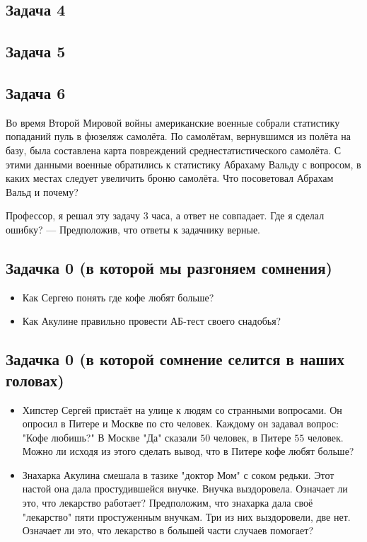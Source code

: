 \documentclass[12pt, a4paper, oneside]{article}
\begin{document}
\subsection*{Задача 4} 



\subsection*{Задача 5} 


\subsection*{Задача 6} 

Во время Второй Мировой войны американские военные собрали статистику попаданий пуль в фюзеляж самолёта. По самолётам, вернувшимся из полёта на базу, была составлена карта повреждений среднестатистического самолёта. С этими данными военные обратились к статистику Абрахаму Вальду с вопросом, в каких местах следует увеличить броню самолёта.
Что посоветовал Абрахам Вальд и почему?



 Профессор, я решал эту задачу 3 часа, а ответ не совпадает. Где я сделал ошибку? — Предположив, что ответы к задачнику верные.



\subsection*{Задачка 0 (в которой мы разгоняем сомнения)}

\begin{itemize}
	\item  Как Сергею понять где кофе любят больше? 
	\item Как Акулине правильно провести АБ-тест своего снадобья? 
\end{itemize}


\subsection*{Задачка 0 (в которой сомнение селится в наших головах)}

\begin{itemize}
	\item  Хипстер Сергей пристаёт на улице к людям со странными вопросами. Он опросил в Питере и Москве по сто человек. Каждому он задавал вопрос: "Кофе любишь?"  В Москве "Да" сказали $50$ человек, в Питере $55$ человек. Можно ли исходя из этого сделать вывод, что в Питере кофе любят больше? 
	
	\item Знахарка Акулина смешала в тазике "доктор Мом" с соком редьки. Этот настой она дала простудившейся внучке. Внучка выздоровела. Означает ли это, что лекарство работает? Предположим, что знахарка дала своё "лекарство" пяти простуженным внучкам. Три из них выздоровели, две нет. Означает ли это, что лекарство в большей части случаев помогает? 
\end{itemize}
\end{document}
